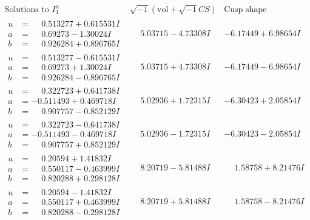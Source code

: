 \documentclass[1p]{elsarticle_modified}
\theoremstyle{definition}
\newcommand{\I}{\sqrt{-1}}
\begin{document}
$$\begin{array}{c|c|c}  
\text{Solutions to }I^u_{1}& \I (\text{vol} + \sqrt{-1}CS) & \text{Cusp shape}\\
 \hline 
\begin{aligned}
u &= \phantom{-}0.513277 + 0.615531 I \\
a &= \phantom{-}0.69273 - 1.30024 I \\
b &= \phantom{-}0.926284 + 0.896765 I\end{aligned}
 & \phantom{-}5.03715 - 4.73308 I & -6.17449 + 6.98654 I \\ \hline\begin{aligned}
u &= \phantom{-}0.513277 - 0.615531 I \\
a &= \phantom{-}0.69273 + 1.30024 I \\
b &= \phantom{-}0.926284 - 0.896765 I\end{aligned}
 & \phantom{-}5.03715 + 4.73308 I & -6.17449 - 6.98654 I \\ \hline\begin{aligned}
u &= \phantom{-}0.322723 + 0.641738 I \\
a &= -0.511493 + 0.469718 I \\
b &= \phantom{-}0.907757 - 0.852129 I\end{aligned}
 & \phantom{-}5.02936 + 1.72315 I & -6.30423 + 2.05854 I \\ \hline\begin{aligned}
u &= \phantom{-}0.322723 - 0.641738 I \\
a &= -0.511493 - 0.469718 I \\
b &= \phantom{-}0.907757 + 0.852129 I\end{aligned}
 & \phantom{-}5.02936 - 1.72315 I & -6.30423 - 2.05854 I \\ \hline\begin{aligned}
u &= \phantom{-}0.20594 + 1.41832 I \\
a &= \phantom{-}0.550117 - 0.463999 I \\
b &= \phantom{-}0.820288 + 0.298128 I\end{aligned}
 & \phantom{-}8.20719 - 5.81488 I & \phantom{-}1.58758 + 8.21476 I \\ \hline\begin{aligned}
u &= \phantom{-}0.20594 - 1.41832 I \\
a &= \phantom{-}0.550117 + 0.463999 I \\
b &= \phantom{-}0.820288 - 0.298128 I\end{aligned}
 & \phantom{-}8.20719 + 5.81488 I & \phantom{-}1.58758 - 8.21476 I \\ \hline\begin{aligned}

\end{aligned}
\end{array}$$
\end{document}
